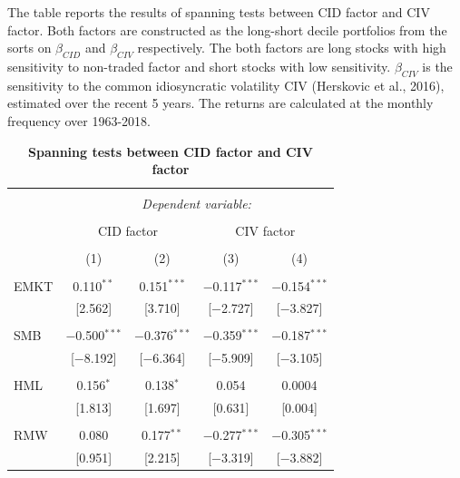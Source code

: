 \documentclass[12pt]{article}
\begin{document}
\begin{table}[!htbp] \centering 
  \caption{\textbf{Spanning tests between CID factor and CIV factor}} 
  \label{} 
  \begin{flushleft}
    {\medskip\small
The table reports the results of spanning tests between CID factor and CIV factor. Both factors are constructed as the long-short decile portfolios from the sorts on $\beta_{CID}$ and $\beta_{CIV}$ respectively. The both factors are long stocks with high sensitivity to non-traded factor and short stocks with low sensitivity. $\beta_{CIV}$ is the sensitivity to the common idiosyncratic volatility CIV (Herskovic et al., 2016), estimated over the recent 5 years. The returns are calculated at the monthly frequency over 1963-2018.}
    \medskip
    \end{flushleft}
\begin{tabular}{@{\extracolsep{5pt}}lcccc} 
\\[-1.8ex]\hline 
\hline \\[-1.8ex] 
 & \multicolumn{4}{c}{\textit{Dependent variable:}} \\ 
\cline{2-5} 
\\[-1.8ex] & \multicolumn{2}{c}{CID factor} & \multicolumn{2}{c}{CIV factor} \\ 
\\[-1.8ex] & (1) & (2) & (3) & (4)\\ 
\hline \\[-1.8ex] 
 EMKT & 0.110$^{**}$ & 0.151$^{***}$ & $-$0.117$^{***}$ & $-$0.154$^{***}$ \\ 
  & [2.562] & [3.710] & [$-$2.727] & [$-$3.827] \\ 
  & & & & \\ 
 SMB & $-$0.500$^{***}$ & $-$0.376$^{***}$ & $-$0.359$^{***}$ & $-$0.187$^{***}$ \\ 
  & [$-$8.192] & [$-$6.364] & [$-$5.909] & [$-$3.105] \\ 
  & & & & \\ 
 HML & 0.156$^{*}$ & 0.138$^{*}$ & 0.054 & 0.0004 \\ 
  & [1.813] & [1.697] & [0.631] & [0.004] \\ 
  & & & & \\ 
 RMW & 0.080 & 0.177$^{**}$ & $-$0.277$^{***}$ & $-$0.305$^{***}$ \\ 
  & [0.951] & [2.215] & [$-$3.319] & [$-$3.882] \\ 

\end{tabular}
\end{table}
\end{document}
